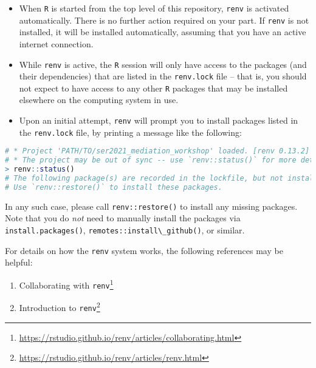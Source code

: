 \documentclass[
  12pt,
]{book}
\newcommand{\passthrough}[1]{#1}
\providecommand{\tightlist}{%
  \setlength{\itemsep}{0pt}\setlength{\parskip}{0pt}}
\renewcommand{\href}[2]{#2\footnote{\url{#1}}}
\theoremstyle{definition}
\theoremstyle{definition}
\theoremstyle{definition}
\newcommand{\1}{\mathbbm{1}}
\begin{document}
\begin{itemize}
\tightlist
\item
  When \passthrough{\lstinline!R!} is started from the top level of this repository, \passthrough{\lstinline!renv!} is
  activated automatically. There is no further action required on your part. If
  \passthrough{\lstinline!renv!} is not installed, it will be installed automatically, assuming that you
  have an active internet connection.
\item
  While \passthrough{\lstinline!renv!} is active, the \passthrough{\lstinline!R!} session will only have access to the packages
  (and their dependencies) that are listed in the \passthrough{\lstinline!renv.lock!} file -- that is,
  you should not expect to have access to any other \passthrough{\lstinline!R!} packages that may be
  installed elsewhere on the computing system in use.
\item
  Upon an initial attempt, \passthrough{\lstinline!renv!} will prompt you to install packages listed in
  the \passthrough{\lstinline!renv.lock!} file, by printing a message like the following:
\end{itemize}

\begin{lstlisting}[language=R]
# * Project 'PATH/TO/ser2021_mediation_workshop' loaded. [renv 0.13.2]
# * The project may be out of sync -- use `renv::status()` for more details.
> renv::status()
# The following package(s) are recorded in the lockfile, but not installed:
# Use `renv::restore()` to install these packages.
\end{lstlisting}

In any such case, please call \passthrough{\lstinline!renv::restore()!} to install any missing packages.
Note that you do \emph{not} need to manually install the packages via
\passthrough{\lstinline!install.packages()!}, \passthrough{\lstinline!remotes::install\_github()!}, or similar.

For details on how the \passthrough{\lstinline!renv!} system works, the following references may be
helpful:

\begin{enumerate}
\def\labelenumi{\arabic{enumi}.}
\tightlist
\item
  \href{https://rstudio.github.io/renv/articles/collaborating.html}{Collaborating with
  \passthrough{\lstinline!renv!}}
\item
  \href{https://rstudio.github.io/renv/articles/renv.html}{Introduction to \passthrough{\lstinline!renv!}}
\end{enumerate}
\end{document}
